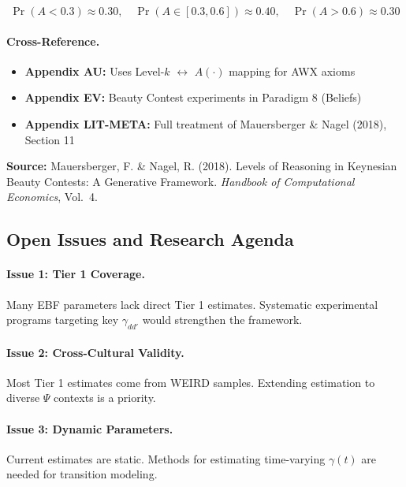 \begin{equation}
\Pr(A < 0.3) \approx 0.30, \quad \Pr(A \in [0.3, 0.6]) \approx 0.40, \quad \Pr(A > 0.6) \approx 0.30
\tag{BBB-LK}
\end{equation}

\paragraph{Cross-Reference.}
\begin{itemize}[nosep]
    \item \textbf{Appendix AU:} Uses Level-$k$ $\leftrightarrow$ $A(\cdot)$ mapping for AWX axioms
    \item \textbf{Appendix EV:} Beauty Contest experiments in Paradigm 8 (Beliefs)
    \item \textbf{Appendix LIT-META:} Full treatment of Mauersberger \& Nagel (2018), Section 11
\end{itemize}

\textbf{Source:} Mauersberger, F. \& Nagel, R. (2018). Levels of Reasoning in Keynesian
Beauty Contests: A Generative Framework. \textit{Handbook of Computational Economics}, Vol.\ 4.


\subsection{Open Issues and Research Agenda}
\label{sec:BBB-openissues}

\paragraph{Issue 1: Tier 1 Coverage.}
Many EBF parameters lack direct Tier 1 estimates. Systematic experimental
programs targeting key $\gamma_{dd'}$ would strengthen the framework.

\paragraph{Issue 2: Cross-Cultural Validity.}
Most Tier 1 estimates come from WEIRD samples. Extending estimation to
diverse $\Psi$ contexts is a priority.

\paragraph{Issue 3: Dynamic Parameters.}
Current estimates are static. Methods for estimating time-varying $\gamma(t)$
are needed for transition modeling.

